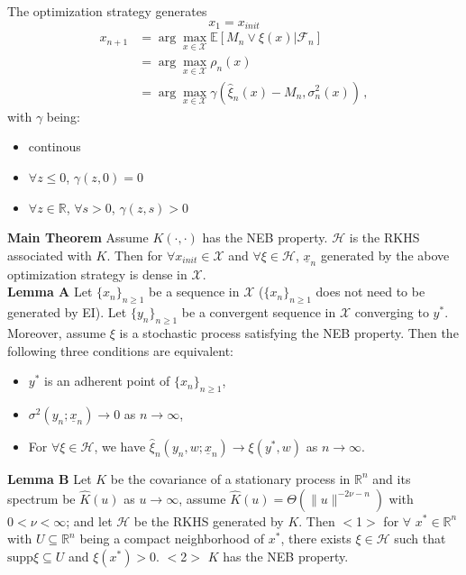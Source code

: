 \documentclass[a4paper,onecolumn]{article}
\begin{document}
\noindent The optimization strategy generates
$$
    x_1 = x_{init}
$$
\begin{equation*}\begin{split}
    x_{n+1} &= \arg\max_{x\in \mathcal{X}} \mathbb{E}\left[M_n \vee \xi(x)\left.\right| \mathcal{F}_n\right]\\
    &= \arg\max_{x\in \mathcal{X}} \rho_n(x)\\
    &= \arg\max_{x\in \mathcal{X}} \gamma\left(\hat{\xi}_n(x) - M_n, \sigma^2_n(x)\right)\,,
\end{split}\end{equation*}
with $\gamma$ being:
\begin{itemize}
    \item continous
    \item $\forall z\le 0$, $\gamma(z,0) =0 $
    \item $\forall z\in \mathbb{R}$, $\forall s>0$, $\gamma(z,s)>0$
\end{itemize}

\noindent \textbf{Main Theorem} Assume $K(\cdot, \cdot)$ has the NEB property. $\mathcal{H}$ is the RKHS associated with $K$.
Then for $\forall x_{init}\in \mathcal{X}$ and $\forall \xi\in \mathcal{H}$, $\underline{x}_n$ generated by the above 
optimization strategy is dense in $\mathcal{X}$.\\

\noindent \textbf{Lemma A} Let $\{x_n\}_{n\ge 1}$ be a sequence in $\mathcal{X}$ ($\{x_n\}_{n\ge 1}$ does not need to be generated by EI).
Let $\{y_n\}_{n\ge 1}$ be a convergent sequence in $\mathcal{X}$ converging to $y^*$. Moreover, assume $\xi$ is a stochastic process
satisfying the NEB property. Then the following three conditions are equivalent:
\begin{itemize}
    \item $y^*$ is an adherent point of $\{x_n\}_{n\ge 1}$,
    \item $\sigma^2(y_n; \underline{x}_n) \rightarrow 0$ as $n\rightarrow \infty$,
    \item For $\forall \xi\in \mathcal{H}$, we have $\hat{\xi}_n(y_n, w; \underline{x}_n) \rightarrow \xi(y^*, w)$ as $n\rightarrow \infty$.
\end{itemize}

\noindent \textbf{Lemma B} Let $K$ be the covariance of a stationary process in $\mathbb{R}^n$ and its spectrum be $\hat{K}(u)$ as $u\rightarrow \infty$, assume 
$\hat{K}(u) = \Theta(\|u\|^{-2\nu -n})$ with $0<\nu< \infty$; and let $\mathcal{H}$ be the RKHS generated by $K$. Then $<$1$>$
for $\forall$ $x^* \in \mathbb{R}^n$ with $U\subseteq \mathbb{R}^n$
being a compact neighborhood of $x^*$, there exists
$\xi \in \mathcal{H}$ such that $\textrm{supp} \xi \subseteq U$ and $\xi(x^*)>0$.
$<$2$>$ $K$ has the NEB property.\\
\end{document}
